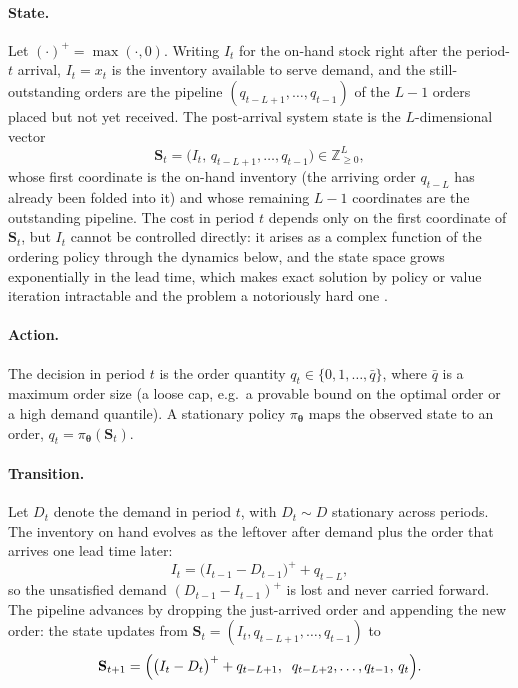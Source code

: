 \documentclass[11pt]{article}
\newcommand{\btheta}{\boldsymbol{\theta}}
\begin{document}
\paragraph{State.}
Let $(\cdot)^{+}=\max(\cdot,0)$. Writing $I_t$ for the on-hand stock right after the period-$t$
arrival, $I_t=x_t$ is the inventory available to serve demand, and the still-outstanding orders are
the pipeline $(q_{t-L+1},\dots,q_{t-1})$ of the $L-1$ orders placed but not yet received. The
post-arrival system state is the $L$-dimensional vector
\begin{equation}
    \mathbf{S}_t = \bigl(I_t,\,q_{t-L+1},\dots,q_{t-1}\bigr)\in\mathbb{Z}_{\ge0}^{L},
    \label{eq:ls-state}
\end{equation}
whose first coordinate is the on-hand inventory (the arriving order $q_{t-L}$ has already been folded
into it) and whose remaining $L-1$ coordinates are the outstanding pipeline. The cost in period $t$
depends only on the first coordinate of $\mathbf{S}_t$, but $I_t$ cannot be controlled directly: it
arises as a complex function of the ordering policy through the dynamics below, and the state space
grows exponentially in the lead time, which makes exact solution by policy or value iteration
intractable and the problem a notoriously hard one \citep{Bijvank2011LostSalesReview}.

\paragraph{Action.}
The decision in period $t$ is the order quantity $q_t\in\{0,1,\dots,\bar q\}$, where $\bar q$ is a
maximum order size (a loose cap, e.g.\ a provable bound on the optimal order or a high demand
quantile). A stationary policy $\pi_{\btheta}$ maps the observed state to an order,
$q_t=\pi_{\btheta}(\mathbf{S}_t)$.

\paragraph{Transition.}
Let $D_t$ denote the demand in period $t$, with $D_t\sim D$ stationary across periods. The inventory
on hand evolves as the leftover after demand plus the order that arrives one lead time later:
\begin{equation}
    I_{t} = \bigl(I_{t-1}-D_{t-1}\bigr)^{+} + q_{t-L},
    \label{eq:ls-transition}
\end{equation}
so the unsatisfied demand $(D_{t-1}-I_{t-1})^{+}$ is lost and never carried forward. The pipeline
advances by dropping the just-arrived order and appending the new order: the state updates from
$\mathbf{S}_t=(I_t,q_{t-L+1},\dots,q_{t-1})$ to
\begin{equation}
    \mathbf{S}_{t+1} = \Bigl(\bigl(I_t-D_t\bigr)^{+}+q_{t-L+1},\;\; q_{t-L+2},\dots,q_{t-1},\,q_t\Bigr).
    \label{eq:ls-state-transition}
\end{equation}
\end{document}
